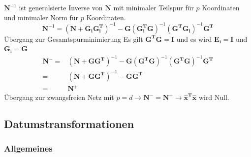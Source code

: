 \documentclass[12pt]{article}
\begin{document}
$\bm{N}^{-1}$ ist generalsierte Inverse von $\bm{N}$ mit minimaler Teilspur für $p$ Koordinaten und minimaler Norm für $p$ Koordinaten.
\begin{equation*}
\bm{N}^{-1} = (\bm{N + G_i G_i^T})^{-1} - \bm{G(G_i^T G)}^{-1} \bm{(G^T G_i)}^{-1} \bm{G^T}
\end{equation*}
Übergang zur Gesamtspurminimierung\newline
Es gilt $\bm{G^T G} = \bm{I}$ und es wird $\bm{E_i} = \bm{I}$ und $\bm{G_i} = \bm{G}$
\begin{align*}
\bm{N}^- =& (\bm{N} + \bm{G G^T})^{-1} - \bm{G}(\bm{G^T G})^{-1}(\bm{G^T G})^{-1} \bm{G^T}\\
= & (\bm{N} + \bm{G G^T})^{-1} - \bm{G}\bm{G^T}\\
= & \bm{N^{+}}
\end{align*}
Übergang zur zwangsfreien Netz mit $p=d\rightarrow \bm{N}^{-} = \bm{N}^{+} \rightarrow \bm{\hat{x}^T \hat{x}}$ wird Null.
\subsection{Datumstransformationen}
\subsubsection{Allgemeines}
\end{document}
